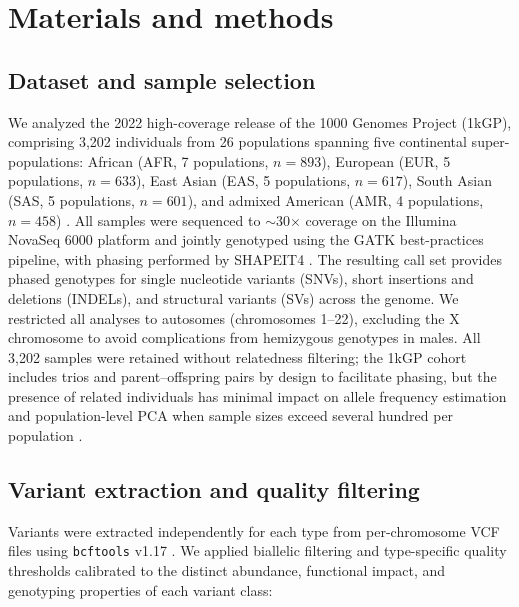 \section*{Materials and methods}

\subsection*{Dataset and sample selection}

We analyzed the 2022 high-coverage release of the 1000 Genomes Project (1kGP), comprising 3,202 individuals from 26 populations spanning five continental super-populations: African (AFR, 7 populations, $n = 893$), European (EUR, 5 populations, $n = 633$), East Asian (EAS, 5 populations, $n = 617$), South Asian (SAS, 5 populations, $n = 601$), and admixed American (AMR, 4 populations, $n = 458$) \citep{byrskaBishop2022}. All samples were sequenced to $\sim$30$\times$ coverage on the Illumina NovaSeq 6000 platform and jointly genotyped using the GATK best-practices pipeline, with phasing performed by SHAPEIT4 \citep{delaneau2019}. The resulting call set provides phased genotypes for single nucleotide variants (SNVs), short insertions and deletions (INDELs), and structural variants (SVs) across the genome. We restricted all analyses to autosomes (chromosomes 1--22), excluding the X chromosome to avoid complications from hemizygous genotypes in males. All 3,202 samples were retained without relatedness filtering; the 1kGP cohort includes trios and parent--offspring pairs by design to facilitate phasing, but the presence of related individuals has minimal impact on allele frequency estimation and population-level PCA when sample sizes exceed several hundred per population \citep{patterson2006}.

\subsection*{Variant extraction and quality filtering}

Variants were extracted independently for each type from per-chromosome VCF files using \texttt{bcftools} v1.17 \citep{danecek2021}. We applied biallelic filtering and type-specific quality thresholds calibrated to the distinct abundance, functional impact, and genotyping properties of each variant class:

